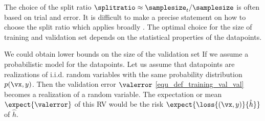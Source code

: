 \documentclass[12pt]{report}
\begin{document}
The choice of the split ratio $\splitratio \approx \samplesize_{t}/ \samplesize$  
is often based on trial and error. It is difficult to make a precise statement on 
how to choose the split ratio which applies broadly \cite{Larsen1999}. The optimal 
choice for the size of training and validation set depends on the statistical properties 
of the datapoints. 

We could obtain lower bounds on the size of the validation set If we assume a 
probabilistic model for the datapoints. Let us assume that datapoints are realizations 
of i.i.d. random variables with the same probability distribution $p(\vx,y)$. Then the 
validation error $\valerror$ \eqref{equ_def_training_val_val} becomes a realization of a random variable. 
The expectation or mean $\expect \{ \valerror \}$ of this RV would be the risk $\expect\{ \loss{(\vx,y)} {\hat{h}} \}$ of $\hat{h}$. 
\end{document}

